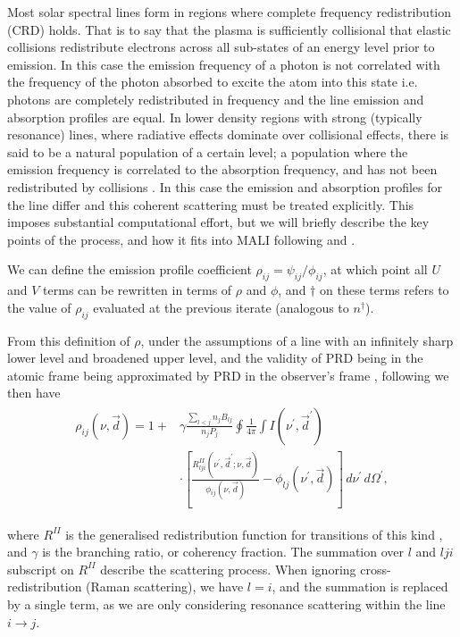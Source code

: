 Most solar spectral lines form in regions where complete frequency redistribution (CRD) holds. That is to say that the plasma is sufficiently collisional that elastic collisions redistribute electrons across all sub-states of an energy level prior to emission. In this case the emission frequency of a photon is not correlated with the frequency of the photon absorbed to excite the atom into this state i.e. photons are completely redistributed in frequency and the line emission and absorption profiles are equal. In lower density regions with strong (typically resonance) lines, where radiative effects dominate over collisional effects, there is said to be a natural population of a certain level; a population where the emission frequency is correlated to the absorption frequency, and has not been redistributed by collisions \citep{Hubeny2014}.
In this case the emission and absorption profiles for the line differ and this coherent scattering must be treated explicitly. This imposes substantial computational effort, but we will briefly describe the key points of the process, and how it fits into MALI following \citet{Uitenbroek2001} and \citet{Hubeny2014}.

We can define the emission profile coefficient $\rho_{ij} = \psi_{ij} / \phi_{ij}$, at which point all $U$ and $V$ terms can be rewritten in terms of $\rho$ and $\phi$, and $\dagger$ on these terms refers to the value of $\rho_{ij}$ evaluated at the previous iterate (analogous to $n^\dagger$).

From this definition of $\rho$, under the assumptions of a line with an infinitely sharp lower level and broadened upper level, and the validity of PRD being in the atomic frame being approximated by PRD in the observer's frame \citep{Uitenbroek2001}, following \citet{Hubeny2014} we then have
\begin{align}
\begin{split}
    \rho_{ij}(\nu, \vec{d}) = 1 + &\gamma\frac{\sum_{l < j}n_j B_{lj}}{n_j P_j} \oint\frac{1}{4\pi}\int I(\nu^\prime, \vec{d}^\prime) \\ &\cdot \left[ \frac{R^{II}_{lji}(\nu^\prime, \vec{d}^\prime; \nu, \vec{d})}{\phi_{ij}(\nu, \vec{d})} - \phi_{lj}(\nu^\prime, \vec{d}) \right]\,d\nu^\prime\,d\Omega^\prime,
\end{split}
\end{align}

where $R^{II}$ is the generalised redistribution function for transitions of this kind \citep{Hubeny1982}, and $\gamma$ is the branching ratio, or coherency fraction.
The summation over $l$ and $lji$ subscript on $R^{II}$ describe the scattering process.
When ignoring cross-redistribution (Raman scattering), we have $l=i$, and the summation is replaced by a single term, as we are only considering resonance scattering within the line $i\rightarrow j$.

